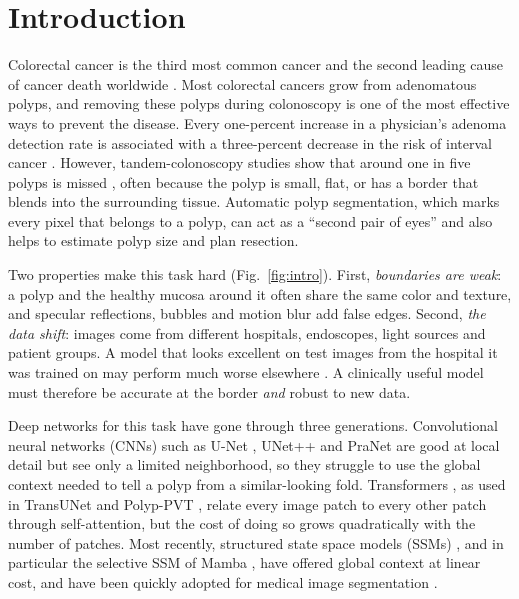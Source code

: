 \documentclass[journal]{IEEEtran}
\begin{document}
\section{Introduction}
\label{sec:intro}

Colorectal cancer is the third most common cancer and the second leading cause of cancer death worldwide \cite{siegel2024cancer}. Most colorectal cancers grow from adenomatous polyps, and removing these polyps during colonoscopy is one of the most effective ways to prevent the disease. Every one-percent increase in a physician's adenoma detection rate is associated with a three-percent decrease in the risk of interval cancer \cite{corley2014adenoma}. However, tandem-colonoscopy studies show that around one in five polyps is missed \cite{vanrijn2006polyp}, often because the polyp is small, flat, or has a border that blends into the surrounding tissue. Automatic polyp segmentation, which marks every pixel that belongs to a polyp, can act as a ``second pair of eyes'' and also helps to estimate polyp size and plan resection.

Two properties make this task hard (Fig.~\ref{fig:intro}). First, \emph{boundaries are weak}: a polyp and the healthy mucosa around it often share the same color and texture, and specular reflections, bubbles and motion blur add false edges. Second, \emph{the data shift}: images come from different hospitals, endoscopes, light sources and patient groups. A model that looks excellent on test images from the hospital it was trained on may perform much worse elsewhere \cite{fan2020pranet,dong2023polyppvt}. A clinically useful model must therefore be accurate at the border \emph{and} robust to new data.

Deep networks for this task have gone through three generations. Convolutional neural networks (CNNs) such as U-Net \cite{ronneberger2015unet}, UNet++ \cite{zhou2018unetpp} and PraNet \cite{fan2020pranet} are good at local detail but see only a limited neighborhood, so they struggle to use the global context needed to tell a polyp from a similar-looking fold. Transformers \cite{dosovitskiy2021vit,liu2021swin,wang2021pvt}, as used in TransUNet \cite{chen2021transunet} and Polyp-PVT \cite{dong2023polyppvt}, relate every image patch to every other patch through self-attention, but the cost of doing so grows quadratically with the number of patches. Most recently, structured state space models (SSMs) \cite{gu2022s4}, and in particular the selective SSM of Mamba \cite{gu2023mamba}, have offered global context at linear cost, and have been quickly adopted for medical image segmentation \cite{ma2024umamba,ruan2024vmunet,liu2024swinumamba,xu2024polypmamba}.
\end{document}
